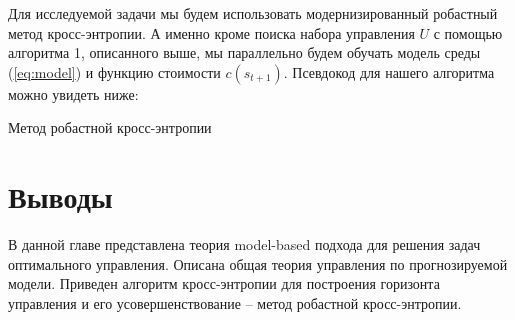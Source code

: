 Для исследуемой задачи мы будем использовать модернизированный робастный метод кросс-энтропии. А именно кроме поиска набора управления $U$  с помощью алгоритма 1, описанного выше, мы параллельно будем обучать модель среды (\ref{eq:model}) и функцию стоимости $c(s_{t+1})$. Псевдокод для нашего алгоритма можно увидеть ниже:\newpage

\begin{algorithm}
	\caption{Метод робастной кросс-энтропии}\label{cem}
	\begin{algorithmic}[1]
		
		
		\EndFor
		\EndWhile
	\end{algorithmic}
\end{algorithm}

\section{Выводы}\label{1sec:optimal-control}


В данной главе представлена теория model-based подхода для решения задач оптимального управления. Описана общая теория управления по прогнозируемой модели. Приведен алгоритм кросс-энтропии для построения горизонта управления и его усовершенствование -- метод робастной кросс-энтропии.





